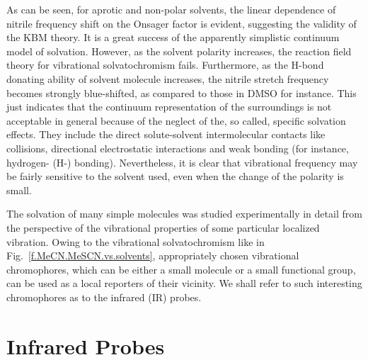 \documentclass[a4paper,titlepage,twoside,fleqn,12pt]{book}
\begin{document}
\begin{refsection}
As can be seen, for aprotic and non-polar solvents, the linear dependence of
nitrile frequency shift on the Onsager factor is evident, suggesting the validity of the KBM theory.
It is a great success of the apparently simplistic continuum model of solvation. 
However, as the solvent polarity increases, the reaction field 
theory for vibrational solvatochromism fails. Furthermore, as the H-bond donating ability of 
solvent molecule increases, the nitrile stretch frequency becomes strongly blue-shifted, as 
compared to those in DMSO for instance.\citep{Wilderen.Luuk.Kern-Michler.Muller-Werkmeister.Bredenbeck.PCCP.2014}
This just indicates that the continuum representation of the surroundings is not acceptable in general
because of the neglect of the, so called, specific solvation effects. 
They include the direct solute\hyp{}solvent intermolecular
contacts like collisions, directional electrostatic interactions and weak bonding (for instance, hydrogen- (H-) bonding).
Nevertheless, it is clear that vibrational frequency may be fairly sensitive 
to the solvent used, even when the change of the polarity is small.

The solvation of many simple molecules was studied experimentally in detail from the perspective of the 
vibrational properties of some particular localized vibration.\citep{Rowlen.Harris.AnalChem.1991,Mayne.Hudson.JPC.1991,
Janroz.Stangret.Lindgren.JACS.1993,Akiyama.Ohtani.SpectchimActA.1994,
Reimers.Hall.JACS.1999,Wilderen.Luuk.Kern-Michler.Muller-Werkmeister.Bredenbeck.PCCP.2014,Jansen.JPCB.2014} 
Owing to the vibrational solvatochromism
like in Fig.~\ref{f.MeCN.MeSCN.vs.solvents}, 
appropriately chosen vibrational chromophores, which can be either a small molecule or a small functional
group, can be used as a local reporters of their vicinity.\citep{Kim.Cho.ChemRev.2013} 
We shall refer to such interesting chromophores as to the infrared (IR) probes. 

\section{Infrared Probes}


\end{refsection}
\end{document}
